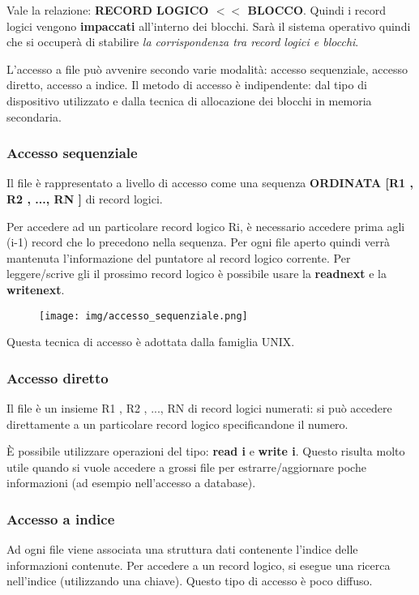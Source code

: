 \documentclass{article}
\begin{document}
\noindent Vale la relazione: \textbf{RECORD LOGICO $<<$ BLOCCO}. Quindi 
i record logici vengono \textbf{impaccati} all'interno dei blocchi.
Sarà il sistema operativo quindi che si occuperà di stabilire
\textit{la corrispondenza tra record logici e blocchi}.
\medskip

\noindent L'accesso a file può avvenire secondo varie modalità: accesso sequenziale, 
accesso diretto, accesso a indice. 
Il metodo di accesso è indipendente: dal tipo di dispositivo utilizzato e
dalla tecnica di allocazione dei blocchi in memoria secondaria.

\subsubsection{Accesso sequenziale}
\noindent Il file è  rappresentato a livello di accesso come 
una sequenza \textbf{ORDINATA [R1 , R2 , ..., RN ]} di record logici.

\noindent Per accedere ad un particolare record logico Ri, è necessario
accedere prima agli (i-1) record che lo precedono nella
sequenza. Per ogni file aperto quindi verrà mantenuta l'informazione
del puntatore al record logico corrente. Per leggere/scrive gli
 il prossimo record logico è possibile usare la \textbf{readnext} e la 
 \textbf{writenext}. 

\begin{figure}[h!]
    \begin{center}
        \texttt{[image: img/accesso\_sequenziale.png]}      
    \end{center}
\end{figure}

Questa tecnica di accesso è adottata dalla famiglia UNIX.

\subsubsection{Accesso diretto}
Il file è un insieme  {R1 , R2 , ..., RN } di record logici
numerati: si può accedere direttamente a un particolare record logico
 specificandone il numero.

\noindent È possibile utilizzare operazioni del tipo:
\textbf{read i} e \textbf{write i}. Questo risulta molto utile
 quando si vuole accedere a grossi file per estrarre/aggiornare poche
  informazioni (ad esempio nell'accesso a database).

\subsubsection{Accesso a indice}
Ad ogni file viene associata una struttura dati contenente
l'indice delle informazioni contenute. Per accedere a un record
 logico, si esegue una ricerca nell'indice (utilizzando una chiave).
 Questo tipo di accesso è poco diffuso.
\end{document}
